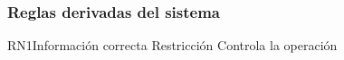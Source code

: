 \subsubsection{Reglas derivadas del sistema}
\begin{BusinessRule}{RN1}{Información correcta}
	{Restricción}
	{Controla la operación}
\end{BusinessRule}
